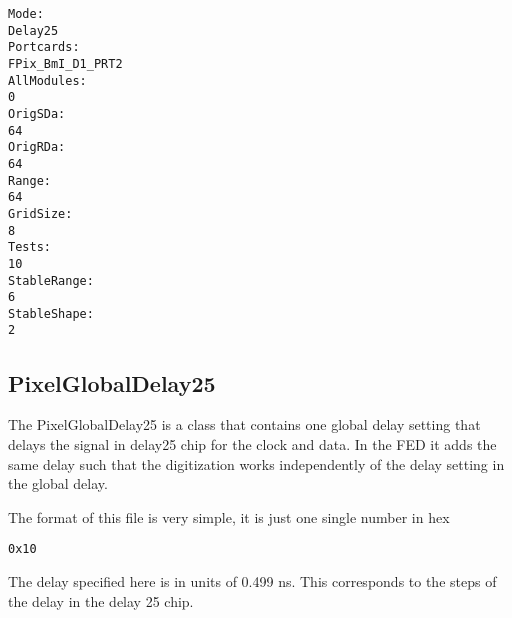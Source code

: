 \begin{verbatim}
Mode:
Delay25
Portcards:
FPix_BmI_D1_PRT2
AllModules:
0
OrigSDa:
64
OrigRDa:
64
Range:
64
GridSize:
8
Tests:
10
StableRange:
6
StableShape:
2
\end{verbatim}


\subsection{PixelGlobalDelay25}

The PixelGlobalDelay25 is a class that contains one global
delay setting that delays the signal in delay25 chip for the
clock and data. In the FED it adds the same delay such that
the digitization works independently of the delay setting
in the global delay.

The format of this file is very simple, it is just one single
number in hex
\begin{verbatim}
0x10
\end{verbatim}
The delay specified here is in units of 0.499 ns. This 
corresponds to the steps of the delay in the delay 25 chip.

